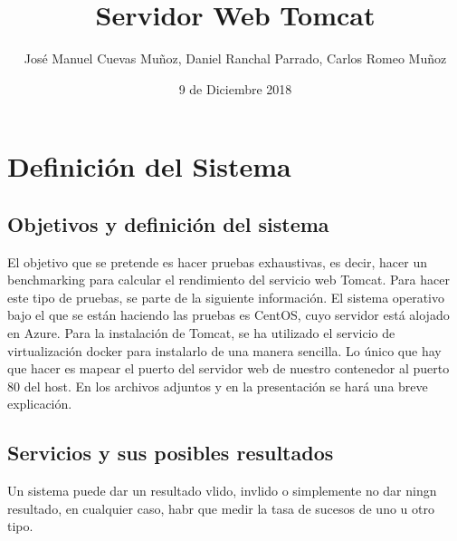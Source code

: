 \documentclass[11pt,twoside,a4paper]{book}
\title{\Huge Servidor Web Tomcat}
\author{José Manuel Cuevas Muñoz, Daniel Ranchal Parrado, Carlos Romeo Muñoz}
\date{9 de Diciembre 2018}
\begin{document}
\maketitle
%
%

\renewcommand\bibname{Bibliografía}
\renewcommand\tablename{Tabla}

 \fancyhf{} \pagestyle{fancy}
\fancyhead[LO]{\rightmark} %
\fancyhead[RE]{\leftmark} %
\fancyhead[RO,LE]{\thepage} %

\setlength{\headheight}{14pt}


\renewcommand{\sectionmark}[1]{\markright{{\thesection. #1}}} %



\tableofcontents
%
%

\chapter{Definición del Sistema}
\section{Objetivos y definición del sistema}
El objetivo que se pretende es hacer pruebas exhaustivas, es decir, hacer un benchmarking para calcular el rendimiento del servicio web Tomcat. Para hacer este tipo de pruebas, se parte de la siguiente información.
El sistema operativo bajo el que se están haciendo las pruebas es CentOS, cuyo servidor está alojado en Azure. Para la instalación de Tomcat, se ha utilizado el servicio de virtualización docker para instalarlo de una manera sencilla. Lo único que hay que hacer es mapear el puerto del servidor web de nuestro contenedor al puerto 80 del host. En los archivos adjuntos y en la presentación se hará una breve explicación.

\section{Servicios y sus posibles resultados}
Un sistema puede dar un resultado vlido, invlido o simplemente no dar ningn resultado, en cualquier caso, habr que medir la tasa de sucesos de uno u otro tipo.
\end{document}
